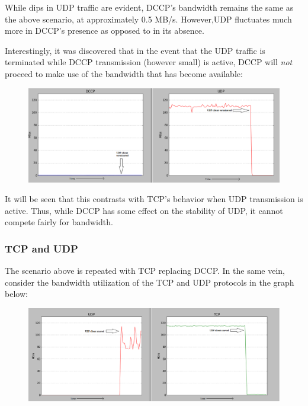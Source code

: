 \documentclass[10pt,a4paper]{article}
\begin{document}
While dips in UDP traffic are evident, DCCP's bandwidth remains
the same as the above scenario, at approximately 0.5 MB/s. However,UDP
fluctuates much more in DCCP's presence as opposed to in its absence.

Interestingly, it was discovered that in the event that the UDP
traffic is terminated while DCCP transmission (however small) is active,
DCCP will \emph{not} proceed to make use of the bandwidth that has
become available:


\begin{figure}[!h]
\begin{center}
\includegraphics[scale=.4]{screens/re/Screenshot-50.png}
\end{center}
\end{figure}

It will be seen that this contrasts with TCP's behavior when
UDP transmission is active. Thus, while DCCP has some effect
on the stability of UDP, it cannot compete fairly for bandwidth.

\subsubsection{TCP and UDP}
The scenario above is repeated with TCP replacing DCCP.
In the same vein, consider the bandwidth utilization of the TCP
and UDP protocols in the graph below:

\begin{figure}[!h]
\begin{center}
\includegraphics[scale=.4]{screens/re/Screenshot-4.png}
\end{center}
\end{figure}
\end{document}
